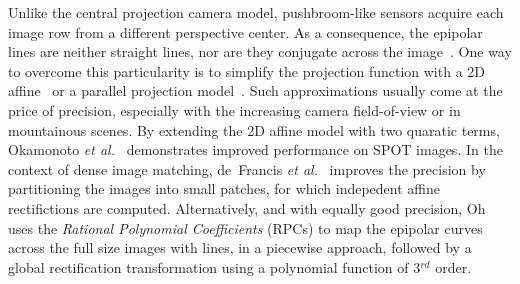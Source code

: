 \documentclass{ipol}
\begin{document}


 



  
%
Unlike the central projection camera model, pushbroom-like sensors acquire each image row from a different perspective center. As a consequence, the epipolar lines are neither straight lines, nor are they conjugate across the image~\cite{Gupta1997}.  One way to overcome this particularity is to simplify the projection function with a 2D affine~\cite{ono1999epipolar,wang2011epipolar} or a parallel projection model~\cite{morgan2006epipolar}. Such approximations usually come at the price of precision, especially with the increasing camera field-of-view or in mountainous scenes. By extending the 2D affine model with two quaratic terms, Okamonoto \textit{et al.}~\cite{okamoto:99:DLT} demonstrates improved performance on SPOT images. In the context of dense image matching, de~Francis \textit{et al.}~\cite{deFrancis2014stereo} improves the precision by partitioning the images into small patches, for which indepedent affine rectifictions are computed. Alternatively, and with equally good precision, Oh~\cite{Oh2011} uses the \textit{Rational Polynomial Coefficients} (RPCs) to map the epipolar curves across the full size images with lines, in a piecewise approach, followed by a global rectification transformation using a polynomial function of 3$^{rd}$ order.
%


\end{document}
